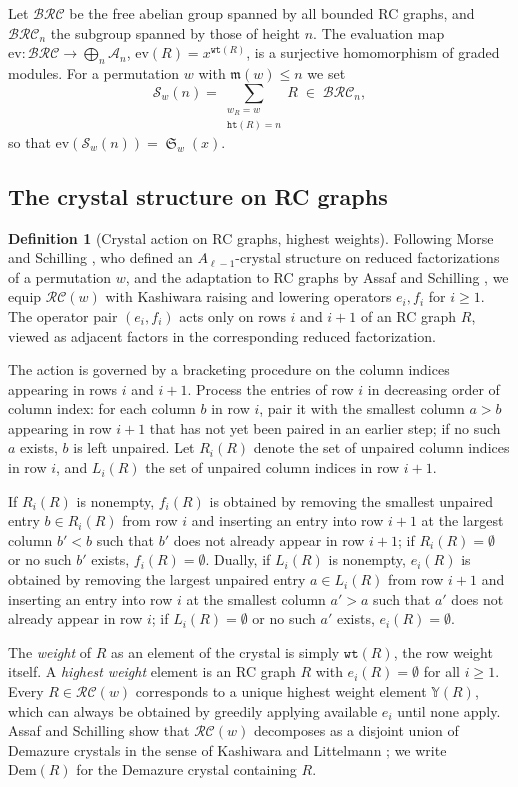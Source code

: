 \documentclass{amsart}
\theoremstyle{definition}
\newtheorem{definition}[lemma]{Definition}
\theoremstyle{remark}
\numberwithin{equation}{subsection}
\DeclareMathOperator{\sch}{\mathfrak{S}}
\newcommand{\wof}[1]{w_{#1}}
\newcommand{\wtt}{\mathtt{wt}}
\newcommand{\hr}{\mathtt{ht}}
\newcommand{\BRC}{\mathcal{BRC}}
\newcommand{\RC}{\mathcal{RC}}
\newcommand{\coma}{\mathcal{A}}
\newcommand{\maxd}{\mathfrak{m}}
\begin{document}
Let $\BRC$ be the free abelian group spanned by all bounded RC graphs, and $\BRC_n$ the subgroup spanned by those of height $n$. The evaluation map $\mathrm{ev}:\BRC\to\bigoplus_n\coma_n$, $\mathrm{ev}(R)=x^{\wtt(R)}$, is a surjective homomorphism of graded modules. For a permutation $w$ with $\maxd(w)\leq n$ we set
$$\mathcal{S}_w(n) = \sum_{\substack{\wof{R}=w\\\hr(R)=n}}R\;\in\;\BRC_n,$$
so that $\mathrm{ev}(\mathcal{S}_w(n))=\sch_w(x)$.

\subsection{The crystal structure on RC graphs}

\begin{definition}[Crystal action on RC graphs, highest weights] \label{definition:crystal}
Following Morse and Schilling \cite{morse2016crystal}, who defined an $A_{\ell-1}$-crystal structure on reduced factorizations of a permutation $w$, and the adaptation to RC graphs by Assaf and Schilling \cite{assaf2018demazure}, we equip $\RC(w)$ with Kashiwara raising and lowering operators $e_i, f_i$ for $i\geq 1$. The operator pair $(e_i, f_i)$ acts only on rows $i$ and $i+1$ of an RC graph $R$, viewed as adjacent factors in the corresponding reduced factorization.

The action is governed by a bracketing procedure on the column indices appearing in rows $i$ and $i+1$. Process the entries of row $i$ in decreasing order of column index: for each column $b$ in row $i$, pair it with the smallest column $a>b$ appearing in row $i+1$ that has not yet been paired in an earlier step; if no such $a$ exists, $b$ is left unpaired. Let $R_i(R)$ denote the set of unpaired column indices in row $i$, and $L_i(R)$ the set of unpaired column indices in row $i+1$.

If $R_i(R)$ is nonempty, $f_i(R)$ is obtained by removing the smallest unpaired entry $b\in R_i(R)$ from row $i$ and inserting an entry into row $i+1$ at the largest column $b' < b$ such that $b'$ does not already appear in row $i+1$; if $R_i(R) = \emptyset$ or no such $b'$ exists, $f_i(R) = \emptyset$. Dually, if $L_i(R)$ is nonempty, $e_i(R)$ is obtained by removing the largest unpaired entry $a\in L_i(R)$ from row $i+1$ and inserting an entry into row $i$ at the smallest column $a' > a$ such that $a'$ does not already appear in row $i$; if $L_i(R) = \emptyset$ or no such $a'$ exists, $e_i(R) = \emptyset$.

The \emph{weight} of $R$ as an element of the crystal is simply $\wtt(R)$, the row weight itself. A \emph{highest weight} element is an RC graph $R$ with $e_i(R) = \emptyset$ for all $i\geq 1$. Every $R\in \RC(w)$ corresponds to a unique highest weight element $\mathbb{Y}(R)$, which can always be obtained by greedily applying available $e_i$ until none apply. Assaf and Schilling \cite{assaf2018demazure} show that $\RC(w)$ decomposes as a disjoint union of Demazure crystals in the sense of Kashiwara \cite{kashiwara1993crystal} and Littelmann \cite{littelmann1995crystal}; we write $\mathrm{Dem}(R)$ for the Demazure crystal containing $R$.
\end{definition}
\end{document}
